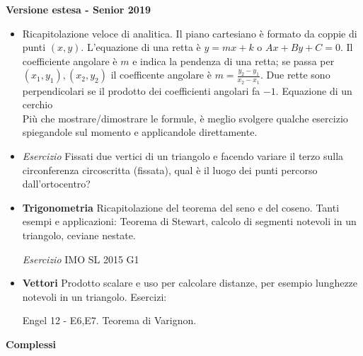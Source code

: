 \vspace{0.3cm}
\large{\textbf{Versione estesa - Senior 2019}}\normalsize
\begin{itemize}
 \item Ricapitolazione veloce di analitica. Il piano cartesiano è formato da coppie di punti $(x,y)$. L'equazione di una retta è $y=mx+k$ o $Ax+By+C=0$. Il coefficiente angolare è $m$ e indica la pendenza di una retta; se passa per $(x_1,y_1),(x_2,y_2)$ il coefficente angolare è $m=\frac{y_2-y_1}{x_2-x_1}$. Due rette sono perpendicolari se il prodotto dei coefficienti angolari fa $-1$. Equazione di un cerchio\\
 Più che mostrare/dimostrare le formule, è meglio svolgere qualche esercizio spiegandole sul momento e applicandole direttamente.

\item \emph{Esercizio} Fissati due vertici di un triangolo e facendo variare il terzo sulla circonferenza circoscritta (fissata), qual è il luogo dei punti percorso dall'ortocentro?



\item \textbf{Trigonometria} Ricapitolazione del teorema del seno e del coseno. Tanti esempi e applicazioni: Teorema di Stewart, calcolo di segmenti notevoli in un triangolo, ceviane nestate. 

\emph{Esercizio} IMO SL 2015 G1


\item \textbf{Vettori} Prodotto scalare e uso per calcolare distanze, per esempio lunghezze notevoli in un triangolo. Esercizi:

Engel 12 - E6,E7. Teorema di Varignon.


\end{itemize}
\textbf{Complessi}\\
